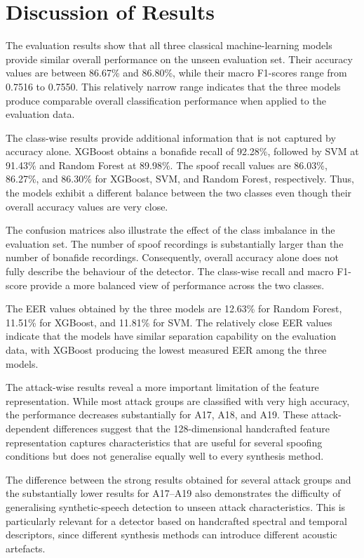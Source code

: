 \documentclass[12pt,a4paper]{report}
\begin{document}
\section{Discussion of Results}

The evaluation results show that all three classical machine-learning models provide similar overall performance on the unseen evaluation set. Their accuracy values are between 86.67\% and 86.80\%, while their macro F1-scores range from 0.7516 to 0.7550. This relatively narrow range indicates that the three models produce comparable overall classification performance when applied to the evaluation data.

The class-wise results provide additional information that is not captured by accuracy alone. XGBoost obtains a bonafide recall of 92.28\%, followed by SVM at 91.43\% and Random Forest at 89.98\%. The spoof recall values are 86.03\%, 86.27\%, and 86.30\% for XGBoost, SVM, and Random Forest, respectively. Thus, the models exhibit a different balance between the two classes even though their overall accuracy values are very close.

The confusion matrices also illustrate the effect of the class imbalance in the evaluation set. The number of spoof recordings is substantially larger than the number of bonafide recordings. Consequently, overall accuracy alone does not fully describe the behaviour of the detector. The class-wise recall and macro F1-score provide a more balanced view of performance across the two classes.

The EER values obtained by the three models are 12.63\% for Random Forest, 11.51\% for XGBoost, and 11.81\% for SVM. The relatively close EER values indicate that the models have similar separation capability on the evaluation data, with XGBoost producing the lowest measured EER among the three models.

The attack-wise results reveal a more important limitation of the feature representation. While most attack groups are classified with very high accuracy, the performance decreases substantially for A17, A18, and A19. These attack-dependent differences suggest that the 128-dimensional handcrafted feature representation captures characteristics that are useful for several spoofing conditions but does not generalise equally well to every synthesis method.

The difference between the strong results obtained for several attack groups and the substantially lower results for A17--A19 also demonstrates the difficulty of generalising synthetic-speech detection to unseen attack characteristics. This is particularly relevant for a detector based on handcrafted spectral and temporal descriptors, since different synthesis methods can introduce different acoustic artefacts.
\end{document}

